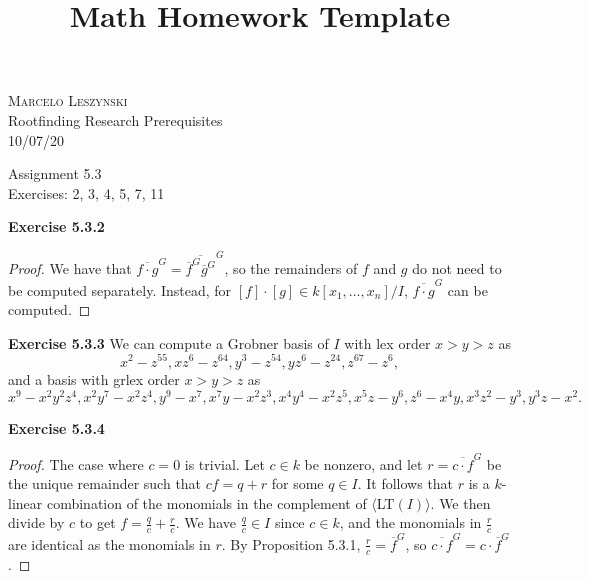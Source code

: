 \documentclass[12pt,oneside]{article}
\newenvironment{exercise}[1]{\vspace{.1in}\noindent\textbf{Exercise #1 \hspace{.05em}}}{}
\begin{document}
\title{Math Homework Template}

\begin{flushright}
\textsc{Marcelo Leszynski}  \\
Rootfinding Research Prerequisites\\
10/07/20
\end{flushright}

\begin{center}
\textsf{Assignment 5.3 } \\
\textsf{Exercises: 2, 3, 4, 5, 7, 11 }
\end{center}


\begin{exercise}{5.3.2}
    \begin{proof}
        We have that $\overline{f\cdot g}^G=\overline{\overline{f}^G\overline{g}^G}^G$,
        so the remainders of $f$ and $g$ do not need to be computed 
        separately. Instead, for $[f] \cdot [g] \in k[x_1,\ldots,x_n]/I$,
        $\overline{f\cdot g}^G$ can be computed.
    \end{proof}
\end{exercise}


\begin{exercise}{5.3.3}
    We can compute a Grobner basis of $I$ with lex order $x>y>z$ 
    as 
    \[
        x^2-z^{55},xz^6-z^{64}, y^3-z^{54},yz^6-z^{24},z^{67}-z^6,
    \]
    and a basis with grlex order $x>y>z$ as 
    \[
        x^9-x^2y^2z^4,x^2y^7-x^2z^4,y^9-x^7,x^7y-x^2z^3,x^4y^4-x^2z^5,x^5z-y^6,z^6-x^4y,x^3z^2-y^3,y^3z-x^2.    
    \]
\end{exercise}


\begin{exercise}{5.3.4}
    \begin{proof}
        The case where $c=0$ is trivial. Let $c \in k$ be nonzero, 
        and let $r=\overline{c\cdot f}^G$ be the unique remainder such 
        that $cf=q+r$ for some $q \in I$. It follows that $r$ is a 
        $k$-linear combination of the monomials in the complement of 
        $\langle$LT$(I)\rangle$. We then divide by $c$ to get $f=\frac{q}{c}+\frac{r}{c}$.
        We have $\frac{q}{c} \in I$ since $c \in k$, and the monomials 
        in $\frac{r}{c}$ are identical as the monomials in $r$. By 
        Proposition 5.3.1, $\frac{r}{c}=\overline{f}^G$, so $\overline{c\cdot f}^G = c \cdot \overline{f}^G$.
    \end{proof}
\end{exercise}
\end{document}
